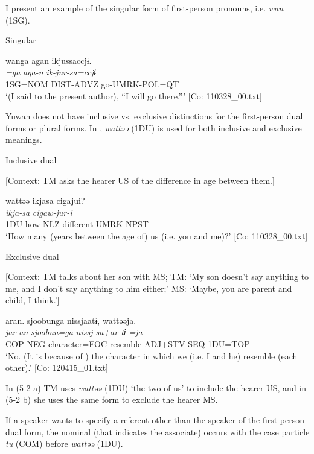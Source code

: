 I present an example of the singular form of first-person pronouns, i.e. \textit{wan} (1SG).

\ea \label{ex:5:2}   Singular

\glll  wanga  agan  ikjussaccjɨ.\\
\textit{=ga}  \textit{aga-n}  \textit{ik-jur-sa=ccjɨ}\\
1SG=NOM  DIST-ADVZ  go-UMRK-POL=QT\\
\glt ‘(I said to the present author), “I will go there.”’ [Co: 110328\_00.txt]
\z

Yuwan does not have inclusive vs. exclusive distinctions for the first-person dual forms or plural forms. In , \textit{wattəə} (1DU) is used for both inclusive and exclusive meanings.

\ea \label{ex:5:3}  \ea \label{ex:5:3a} Inclusive dual

    [Context: TM asks the hearer US of the difference in age between them.]

\glll  wattəə  ikjasa  cigajui?\\
\textit{}  \textit{ikja-sa}  \textit{cigaw-jur-i}\\
1DU  how-NLZ  different-UMRK-NPST\\
\glt ‘How many (years between the age of) us (i.e. you and me)?’ [Co: 110328\_00.txt]

 \ex \label{ex:5:b} Exclusive dual

    [Context: TM talks about her son with MS; TM: ‘My son doesn’t say anything to me, and I don’t say anything to him either;’ MS: ‘Maybe, you are parent and child, I think.’]

\glll  aran.  sjoobunga  nissjaatɨ,  wattəəja.\\
\textit{jar-an}  \textit{sjoobun=ga}  \textit{nissj-sa+ar-tɨ}  \textit{=ja}\\
COP-NEG  character=FOC  resemble-ADJ+STV-SEQ  1DU=TOP\\
\glt ‘No. (It is because of ) the character in which we (i.e. I and he) resemble (each other).’ [Co: 120415\_01.txt]
\z
\z

In (5-2 a) TM uses \textit{wattəə} (1DU) ‘the two of us’ to include the hearer US, and in (5-2 b) she uses the same form to exclude the hearer MS.

If a speaker wants to specify a referent other than the speaker of the first-person dual form, the nominal (that indicates the associate) occurs with the case particle \textit{tu} (COM) before \textit{wattəə} (1DU).

